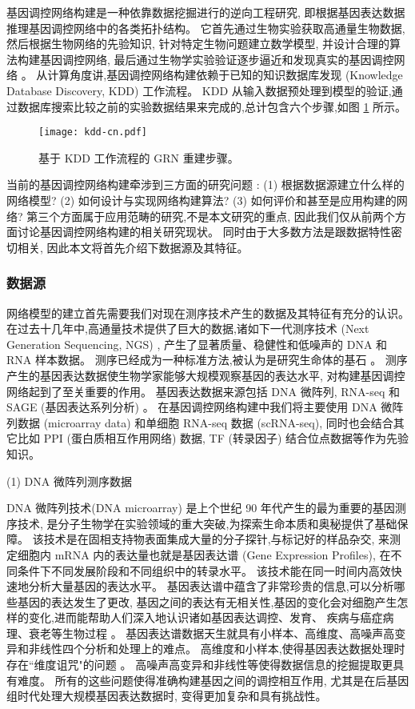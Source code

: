 基因调控网络构建是一种依靠数据挖掘进行的逆向工程研究, 即根据基因表达数据推理基因调控网络中的各类拓扑结构。
它首先通过生物实验获取高通量生物数据, 然后根据生物网络的先验知识, 针对特定生物问题建立数学模型, 
并设计合理的算法构建基因调控网络, 最后通过生物学实验验证逐步逼近和发现真实的基因调控网络 \cite{sima2009inference}。
从计算角度讲,基因调控网络构建依赖于已知的知识数据库发现 (Knowledge Database Discovery, KDD) 工作流程。
KDD 从输入数据预处理到模型的验证,通过数据库搜索比较之前的实验数据结果来完成的,总计包含六个步骤,如图 \ref{cover-3} 所示。
\begin{figure}[!htbp]
    \centering
    \texttt{[image: kdd-cn.pdf]}
    \caption{基于 KDD 工作流程的 GRN 重建步骤。}
    \label{cover-3}
\end{figure}

当前的基因调控网络构建牵涉到三方面的研究问题 \cite{schlitt2007current}:
(1) 根据数据源建立什么样的网络模型?
(2) 如何设计与实现网络构建算法?
(3) 如何评价和甚至是应用构建的网络?
第三个方面属于应用范畴的研究,不是本文研究的重点, 因此我们仅从前两个方面讨论基因调控网络构建的相关研究现状。
同时由于大多数方法是跟数据特性密切相关, 因此本文将首先介绍下数据源及其特征。

\subsubsection{数据源}

网络模型的建立首先需要我们对现在测序技术产生的数据及其特征有充分的认识。
在过去十几年中,高通量技术提供了巨大的数据,诸如下一代测序技术 (Next Generation Sequencing, NGS) \cite{BUERMANS20141932}, 
产生了显著质量、稳健性和低噪声的 DNA 和 RNA 样本数据。
测序已经成为一种标准方法,被认为是研究生命体的基石 \cite{CEREB2015923}。
测序产生的基因表达数据使生物学家能够大规模观察基因的表达水平, 对构建基因调控网络起到了至关重要的作用。
基因表达数据来源包括 DNA 微阵列, RNA-seq \cite{morin2008profiling}和 SAGE (基因表达系列分析) \cite{velculescu1995serial}。
在基因调控网络构建中我们将主要使用 DNA 微阵列数据 (microarray data) 和单细胞 RNA-seq 数据 (scRNA-seq),
同时也会结合其它比如 PPI (蛋白质相互作用网络) 数据, TF (转录因子) 结合位点数据等作为先验知识。

(1) DNA 微阵列测序数据

DNA 微阵列技术(DNA microarray) 是上个世纪 90 年代产生的最为重要的基因测序技术,
是分子生物学在实验领域的重大突破,为探索生命本质和奥秘提供了基础保障。
该技术是在固相支持物表面集成大量的分子探针,与标记好的样品杂交,
来测定细胞内 mRNA 内的表达量也就是基因表达谱 (Gene Expression Profiles),
在不同条件下不同发展阶段和不同组织中的转录水平。
该技术能在同一时间内高效快速地分析大量基因的表达水平。
基因表达谱中蕴含了非常珍贵的信息,可以分析哪些基因的表达发生了更改, 
基因之间的表达有无相关性,基因的变化会对细胞产生怎样的变化,进而能帮助人们深入地认识诸如基因表达调控、发育、
疾病与癌症病理、衰老等生物过程 \cite{chen2005selecting,shen2009new,camargo2008identification}。
基因表达谱数据天生就具有小样本、高维度、高噪声高变异和非线性四个分析和处理上的难点。
高维度和小样本,使得基因表达数据处理时存在``维度诅咒"的问题 \cite{wang2006inferring}。
高噪声高变异和非线性等使得数据信息的挖掘提取更具有难度。
所有的这些问题使得准确构建基因之间的调控相互作用,
尤其是在后基因组时代处理大规模基因表达数据时,
变得更加复杂和具有挑战性。

